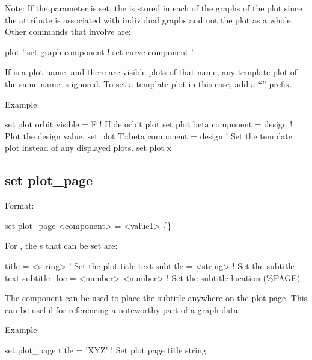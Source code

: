 {{{{{Note: If the  parameter is set, the  is stored in each of the graphs of
the plot since the  attribute is associated with individual graphs and not the plot as
a whole. Other commands that involve  are:
\begin{example}
  plot                    ! 
  set graph component     ! 
  set curve component     ! 
\end{example}

If  is a plot name, and there are visible plots of that name, any template plot of the same
name is ignored. To set a template plot in this case, add a ``'' prefix.

Example:
\begin{example}
  set plot orbit visible = F           ! Hide orbit plot
  set plot beta component = design     ! Plot the design value.
  set plot T::beta component = design  ! Set the template plot instead of any displayed plots.
  set plot x%
\end{example}


\subsection{set plot\_page}
\label{s:set.plot.page}

Format:
\begin{example}
  set plot_page <component> = <value1> \{<value2>\}
\end{example}

For , the s that can be set are:
\begin{example}
  title        = <string>          ! Set the plot title text
  subtitle     = <string>          ! Set the subtitle text
  subtitle_loc = <number> <number> ! Set the subtitle location (\%PAGE)
\end{example}
The  component can be used to place the subtitle anywhere on the plot
page. This can be useful for referencing a noteworthy part of a graph data.

Example:
\begin{example}
  set plot_page title = 'XYZ'  ! Set plot page title string
\end{example}


}}}}}
